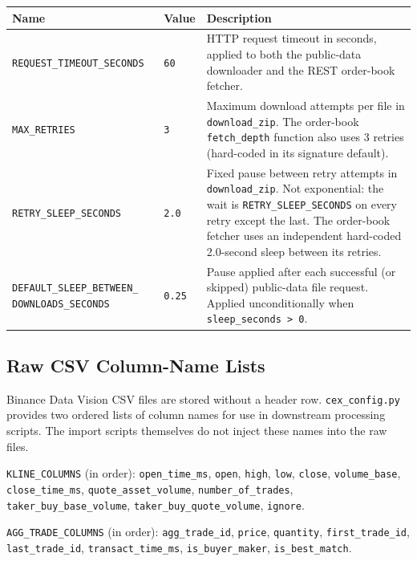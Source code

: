 \documentclass[11pt,a4paper]{article}
\begin{document}
\begin{xltabular}{\linewidth}{L{5.2cm}L{2.0cm}Y}
\toprule
\textbf{Name} & \textbf{Value} & \textbf{Description} \\
\midrule
\texttt{REQUEST\_TIMEOUT\_SECONDS} & \texttt{60} &
  HTTP request timeout in seconds, applied to both the public-data
  downloader and the REST order-book fetcher. \\
\texttt{MAX\_RETRIES} & \texttt{3} &
  Maximum download attempts per file in \texttt{download\_zip}.
  The order-book \texttt{fetch\_depth} function also uses 3 retries
  (hard-coded in its signature default). \\
\texttt{RETRY\_SLEEP\_SECONDS} & \texttt{2.0} &
  Fixed pause between retry attempts in \texttt{download\_zip}.
  Not exponential: the wait is \texttt{RETRY\_SLEEP\_SECONDS}
  on every retry except the last. The order-book fetcher uses
  an independent hard-coded 2.0-second sleep between its retries. \\
\texttt{DEFAULT\_SLEEP\_BETWEEN\_ DOWNLOADS\_SECONDS} &
  \texttt{0.25} &
  Pause applied after each successful (or skipped) public-data
  file request. Applied unconditionally when \texttt{sleep\_seconds
  > 0}. \\
\bottomrule
\end{xltabular}

\subsection{Raw CSV Column-Name Lists}

Binance Data Vision CSV files are stored without a header row.
\texttt{cex\_config.py} provides two ordered lists of column names
for use in downstream processing scripts. The import scripts
themselves do not inject these names into the raw files.

\texttt{KLINE\_COLUMNS} (in order):
\texttt{open\_time\_ms},
\texttt{open},
\texttt{high},
\texttt{low},
\texttt{close},
\texttt{volume\_base},
\texttt{close\_time\_ms},
\texttt{quote\_asset\_volume},
\texttt{number\_of\_trades},
\texttt{taker\_buy\_base\_volume},
\texttt{taker\_buy\_quote\_volume},
\texttt{ignore}.

\texttt{AGG\_TRADE\_COLUMNS} (in order):
\texttt{agg\_trade\_id},
\texttt{price},
\texttt{quantity},
\texttt{first\_trade\_id},
\texttt{last\_trade\_id},
\texttt{transact\_time\_ms},
\texttt{is\_buyer\_maker},
\texttt{is\_best\_match}.

\end{document}
